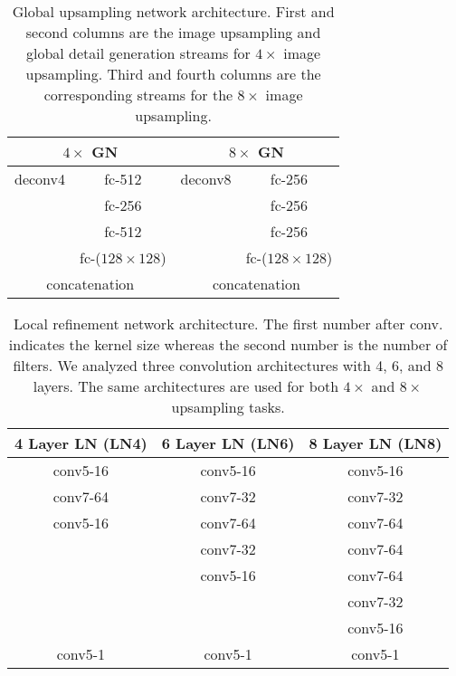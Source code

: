 \documentclass[runningheads]{llncs}
\begin{document}
\begin{table}[tb]
	\centering
	\caption{Global upsampling network architecture. First and second columns are the image upsampling and global detail generation streams for $4 \times$ image upsampling. Third and fourth columns are the corresponding streams for the $8 \times$ image upsampling.}
	\label{tab:GN}
	\vspace{-4mm}
		\begin{tabular}[t]{|c|c|c|c|}
		\hline
		\multicolumn{2}{|c}{$4 \times$ GN } & \multicolumn{2}{|c|}{$8 \times$ GN } \\ \hline \hline
		deconv4 & fc-512 & deconv8 & fc-256 \\ %
						& fc-256 & 			  & fc-256 \\ %
						& fc-512 & 			  & fc-256 \\ %
						& fc-($128 \times 128$) & 			  & fc-($128 \times 128$) \\ \hline
		\multicolumn{2}{|c}{concatenation } & \multicolumn{2}{|c|}{concatenation } \\ \hline			
		\end{tabular}
\end{table}


\begin{table}[tb]
	\centering
	\caption{Local refinement network architecture. The first number after conv. indicates the kernel size whereas the second number is the number of filters. We analyzed three convolution architectures with 4, 6, and 8 layers. The same architectures are used for both $4 \times$ and $8 \times$ upsampling tasks.}
    \vspace{-4mm}
	\label{tab:LN}
		\begin{tabular}[t]{|c|c|c|}
		\hline
		4 Layer LN (LN4) & 6 Layer LN (LN6) & 8 Layer LN (LN8)\\ \hline \hline
		conv5-16 & conv5-16 & conv5-16 \\
		conv7-64 & conv7-32 & conv7-32 \\
		conv5-16 & conv7-64 & conv7-64\\
						 & conv7-32 & conv7-64\\
						 & conv5-16 & conv7-64\\						
						 & 				  & conv7-32\\												
						 & 				  & conv5-16\\ \hline
		conv5-1  & conv5-1  & conv5-1\\ \hline								
		\end{tabular}
\end{table}
\end{document}
